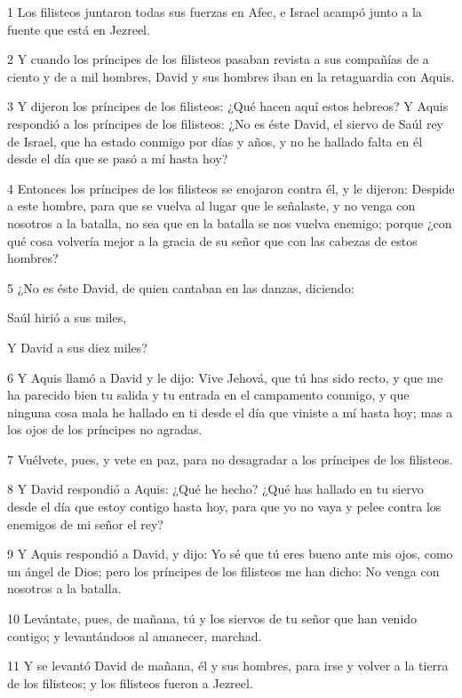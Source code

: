 {\par 1 Los filisteos juntaron todas sus fuerzas en Afec, e Israel acampó junto a la fuente que está en Jezreel.
\par 2 Y cuando los príncipes de los filisteos pasaban revista a sus compañías de a ciento y de a mil hombres, David y sus hombres iban en la retaguardia con Aquis.
\par 3 Y dijeron los príncipes de los filisteos: ¿Qué hacen aquí estos hebreos? Y Aquis respondió a los príncipes de los filisteos: ¿No es éste David, el siervo de Saúl rey de Israel, que ha estado conmigo por días y años, y no he hallado falta en él desde el día que se pasó a mí hasta hoy?
\par 4 Entonces los príncipes de los filisteos se enojaron contra él, y le dijeron: Despide a este hombre, para que se vuelva al lugar que le señalaste, y no venga con nosotros a la batalla, no sea que en la batalla se nos vuelva enemigo; porque ¿con qué cosa volvería mejor a la gracia de su señor que con las cabezas de estos hombres?
\par 5 ¿No es éste David, de quien cantaban en las danzas, diciendo:
\par Saúl hirió a sus miles,
\par Y David a sus diez miles?
\par 6 Y Aquis llamó a David y le dijo: Vive Jehová, que tú has sido recto, y que me ha parecido bien tu salida y tu entrada en el campamento conmigo, y que ninguna cosa mala he hallado en ti desde el día que viniste a mí hasta hoy; mas a los ojos de los príncipes no agradas.
\par 7 Vuélvete, pues, y vete en paz, para no desagradar a los príncipes de los filisteos.
\par 8 Y David respondió a Aquis: ¿Qué he hecho? ¿Qué has hallado en tu siervo desde el día que estoy contigo hasta hoy, para que yo no vaya y pelee contra los enemigos de mi señor el rey?
\par 9 Y Aquis respondió a David, y dijo: Yo sé que tú eres bueno ante mis ojos, como un ángel de Dios; pero los príncipes de los filisteos me han dicho: No venga con nosotros a la batalla.
\par 10 Levántate, pues, de mañana, tú y los siervos de tu señor que han venido contigo; y levantándoos al amanecer, marchad.
\par 11 Y se levantó David de mañana, él y sus hombres, para irse y volver a la tierra de los filisteos; y los filisteos fueron a Jezreel.

}

